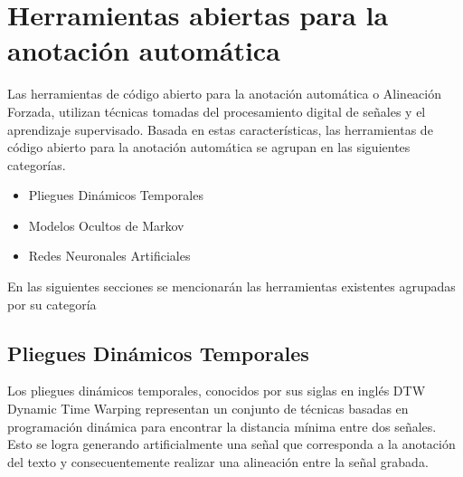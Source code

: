\section{Herramientas abiertas para la anotación automática}

Las herramientas de código abierto para la anotación automática o Alineación Forzada, utilizan técnicas tomadas del procesamiento digital de señales y el aprendizaje supervisado. Basada en estas características, las herramientas de código abierto para la anotación automática se agrupan en las siguientes categorías.

\begin{itemize}
    \item Pliegues Dinámicos Temporales
    \item Modelos Ocultos de Markov
    \item Redes Neuronales Artificiales
\end{itemize}

En las siguientes secciones se mencionarán las herramientas existentes  agrupadas por su categoría

\subsection{Pliegues Dinámicos Temporales}

Los pliegues dinámicos temporales, conocidos por sus siglas en inglés DTW Dynamic Time Warping \cite{Sakoe1978DynamicRecognition} representan un conjunto de técnicas basadas en programación dinámica para encontrar la distancia mínima entre dos señales. Esto se logra generando artificialmente una señal que corresponda a la anotación del texto y consecuentemente realizar una alineación entre la señal grabada.


